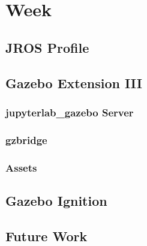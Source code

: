 \chapter{Week}

\section{JROS Profile}




\section{Gazebo Extension III}

    \subsection{jupyterlab\_gazebo Server}
    
    \subsection{gzbridge}
    
    \subsection{Assets}
    
    
\section{Gazebo Ignition}


\section{Future Work}